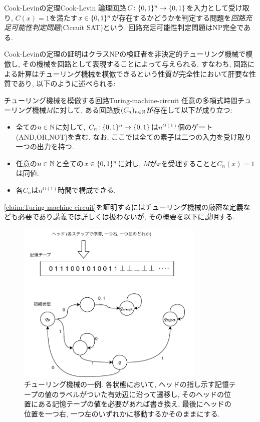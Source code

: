 \begin{theorem}{Cook-Levinの定理}{Cook-Levin}
  論理回路$C\colon\{0,1\}^n\to\{0,1\}$を入力として受け取り, $C(x)=1$を満たす$x\in\{0,1\}^n$が存在するかどうかを判定する問題を\emph{回路充足可能性判定問題}(Circuit SAT)という.
  回路充足可能性判定問題はNP完全である.
\end{theorem}



Cook-Levinの定理の証明はクラスNPの検証者を非決定的チューリング機械で模倣し, その機械を回路として表現することによって与えられる.
すなわち, 回路による計算はチューリング機械を模倣できるという性質が完全性において肝要な性質であり, 以下のように述べられる:
\begin{claim}{チューリング機械を模倣する回路}{Turing-machine-circuit}
  任意の多項式時間チューリング機械$M$に対して, ある回路族$(C_n)_{n\in\mathbb{N}}$が存在して以下が成り立つ:
  \begin{itemize}
    \item 全ての$n\in\mathbb{N}$に対して, $C_n\colon\{0,1\}^n\to\{0,1\}$は$n^{O(1)}$個のゲート(AND,OR,NOT)を含む. なお, ここでは全ての素子は二つの入力を受け取り一つの出力を持つ.
    \item 任意の$n\in\mathbb{N}$と全ての$x\in\{0,1\}^n$に対し, $M$が$x$を受理することと$C_n(x)=1$は同値.
    \item 各$C_n$は$n^{O(1)}$時間で構成できる.
  \end{itemize}
\end{claim}
\cref{claim:Turing-machine-circuit}を証明するにはチューリング機械の厳密な定義なども必要であり講義では詳しくは扱わないが, その概要を以下に説明する.

\begin{figure}[ht]
  \centering
  \includegraphics[width=0.8\textwidth]{images/Turing.pdf}
  \caption{チューリング機械の一例. 各状態において, ヘッドの指し示す記憶テープの値のラベルがついた有効辺に沿って遷移し, そのヘッドの位置にある記憶テープの値を必要があれば書き換え, 最後にヘッドの位置を一つ右, 一つ左のいずれかに移動するかそのままにする. \label{fig:Turing-machine}}
\end{figure}


